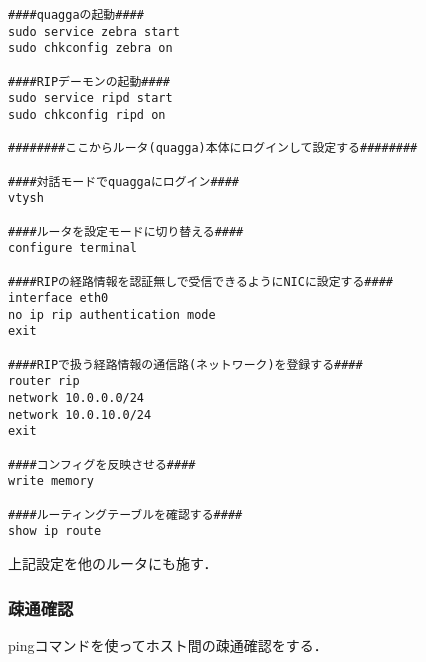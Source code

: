 \begin{shadebox}
\begin{verbatim}
####quaggaの起動####
sudo service zebra start
sudo chkconfig zebra on

####RIPデーモンの起動####
sudo service ripd start
sudo chkconfig ripd on

########ここからルータ(quagga)本体にログインして設定する########

####対話モードでquaggaにログイン####
vtysh

####ルータを設定モードに切り替える####
configure terminal

####RIPの経路情報を認証無しで受信できるようにNICに設定する####
interface eth0
no ip rip authentication mode
exit

####RIPで扱う経路情報の通信路(ネットワーク)を登録する####
router rip
network 10.0.0.0/24
network 10.0.10.0/24
exit

####コンフィグを反映させる####
write memory

####ルーティングテーブルを確認する####
show ip route

\end{verbatim}
\end{shadebox}

上記設定を他のルータにも施す．

\vspace{-6mm}
\subsubsection{疎通確認}
pingコマンドを使ってホスト間の疎通確認をする．

\newpage


